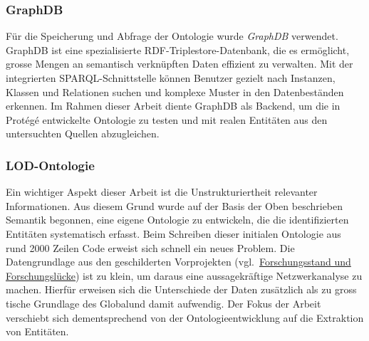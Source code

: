 \documentclass[12pt, a4paper, ngerman, bidi=default]{article}
\begin{document}
\subsubsection{GraphDB} Für die Speicherung und Abfrage der Ontologie wurde \textit{GraphDB} verwendet. 
GraphDB ist eine spezialisierte RDF-Triplestore-Datenbank, die es ermöglicht, 
grosse Mengen an semantisch verknüpften Daten effizient zu verwalten. 
Mit der integrierten SPARQL-Schnittstelle können Benutzer gezielt nach Instanzen, Klassen und Relationen suchen 
und komplexe Muster in den Datenbeständen erkennen. 
Im Rahmen dieser Arbeit diente GraphDB als Backend, um die in Protégé entwickelte Ontologie zu testen 
und mit realen Entitäten aus den untersuchten Quellen abzugleichen.



\noindent
\begin{minipage}[t]{0.52\textwidth}
  \justifying%
\subsubsection{LOD-Ontologie}
Ein wichtiger Aspekt dieser Arbeit ist die Unstrukturiertheit relevanter Informationen. 
Aus diesem Grund wurde auf der Basis der Oben beschrieben Semantik begonnen, eine eigene Ontologie zu entwickeln, die die identifizierten Entitäten systematisch erfasst.
Beim Schreiben dieser initialen Ontologie aus rund 2000 Zeilen Code erweist sich schnell ein neues Problem. Die Datengrundlage aus den geschilderten Vorprojekten (vgl.~\hyperref[subsec:forschungsstand]{Forschungsstand und Forschungslücke}) ist 
zu klein, um daraus eine aussagekräftige Netzwerkanalyse zu machen. Hierfür erweisen sich die Unterschiede der Daten zusätzlich als zu gross tische Grundlage des Globalund damit aufwendig. Der Fokus der Arbeit verschiebt sich dementsprechend von der Ontologieentwicklung 
auf die Extraktion von Entitäten.
\end{minipage}%
\hfill%
\end{document}
